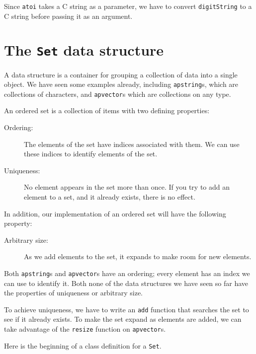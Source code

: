 Since {\tt atoi} takes a C string as a parameter, we have
to convert {\tt digitString} to a C string before passing it
as an argument.

\section{The {\tt Set} data structure}

A data structure is a container for grouping a collection
of data into a single object.  We have seen some examples already,
including {\tt apstring}s, which are collections of characters,
and {\tt apvector}s which are collections on any type.

An ordered set is a collection of items with two defining
properties:

\begin{description}

\item[Ordering:] The elements of the set have indices associated
with them.  We can use these indices to identify elements of the set.

\item[Uniqueness:] No element appears in the set more than once.
If you try to add an element to a set, and it already exists, there
is no effect.

\end{description}

In addition, our implementation of an ordered set will have the
following property:

\begin{description}

\item[Arbitrary size:] As we add elements to the set, it expands
to make room for new elements.

\end{description}

Both {\tt apstring}s and {\tt apvector}s have an ordering; every
element has an index we can use to identify it.  Both none of
the data structures we have seen so far have the properties of
uniqueness or arbitrary size.


To achieve uniqueness, we have to write an {\tt add} function
that searches the set to see if it already exists.  To make the
set expand as elements are added, we can take advantage of the
{\tt resize} function on {\tt apvector}s.

Here is the beginning of a class definition for a {\tt Set}.

